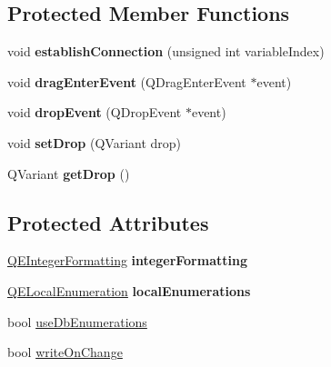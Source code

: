\subsection*{Protected Member Functions}
\begin{DoxyCompactItemize}
\item 
\hypertarget{classQEComboBox_acce88dfbe8a9f681657ba59538647bfb}{
void {\bfseries establishConnection} (unsigned int variableIndex)}
\label{classQEComboBox_acce88dfbe8a9f681657ba59538647bfb}

\item 
\hypertarget{classQEComboBox_ab1ef06ae1a7b70f8655205188aef3026}{
void {\bfseries dragEnterEvent} (QDragEnterEvent $\ast$event)}
\label{classQEComboBox_ab1ef06ae1a7b70f8655205188aef3026}

\item 
\hypertarget{classQEComboBox_a8dada31918b11de7e09bb289dab84eb0}{
void {\bfseries dropEvent} (QDropEvent $\ast$event)}
\label{classQEComboBox_a8dada31918b11de7e09bb289dab84eb0}

\item 
\hypertarget{classQEComboBox_adec7d5cde475153e479ccf7d54ceee5e}{
void {\bfseries setDrop} (QVariant drop)}
\label{classQEComboBox_adec7d5cde475153e479ccf7d54ceee5e}

\item 
\hypertarget{classQEComboBox_a84450a5964161493cc321d6879cee972}{
QVariant {\bfseries getDrop} ()}
\label{classQEComboBox_a84450a5964161493cc321d6879cee972}

\end{DoxyCompactItemize}
\subsection*{Protected Attributes}
\begin{DoxyCompactItemize}
\item 
\hypertarget{classQEComboBox_a1cbb3fff5cbb03dc7152f2957e5d21ee}{
\hyperlink{classQEIntegerFormatting}{QEIntegerFormatting} {\bfseries integerFormatting}}
\label{classQEComboBox_a1cbb3fff5cbb03dc7152f2957e5d21ee}

\item 
\hypertarget{classQEComboBox_afc717cbe62ea91f3ac4d59153bfb692c}{
\hyperlink{classQELocalEnumeration}{QELocalEnumeration} {\bfseries localEnumerations}}
\label{classQEComboBox_afc717cbe62ea91f3ac4d59153bfb692c}

\item 
bool \hyperlink{classQEComboBox_a39bb3371e530bbf24ea08e4552e52495}{useDbEnumerations}
\item 
bool \hyperlink{classQEComboBox_acb21edfaee598bab9e64ed24089187c7}{writeOnChange}
\end{DoxyCompactItemize}
